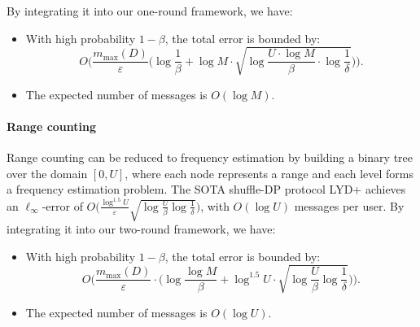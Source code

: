 By integrating it into our one-round framework, we have:

\begin{itemize}
\item With high probability $1-\beta$, the total error is bounded by: 
$$
O\Big(\frac{m_{\max}(D)}{\varepsilon}\big(\log \frac{1}{\beta}+\log M \cdot \sqrt{
\log \frac{U\cdot\log M }{\beta}
\cdot \log \frac{1}{\delta} }\big)\Big).
$$

\item The expected number of messages is $O(\log M)$.
\end{itemize}


\paragraph{Range counting}

Range counting can be reduced to frequency estimation by building a binary tree over the domain $[0,U]$, where each node represents a range and each level forms a frequency estimation problem.
The SOTA shuffle-DP protocol LYD+ \cite{luo2025rm2} achieves an $\ell_{\infty}$-error of
$O\big(\tfrac{\log^{1.5} U}{\varepsilon} \sqrt{\log \tfrac{U}{\beta} \log \tfrac{1}{\delta}}\big)$, with $O(\log U)$ messages per user.
By integrating it into our two-round framework, we have:
\begin{itemize}
\item With high probability $1-\beta$, the total error is bounded by: 
$$
O\Big(\frac{m_{\max}(D)}{\varepsilon}\cdot \big(\log\frac{\log M}{\beta}+\log^{1.5}U\cdot\sqrt{\log \frac{U}{\beta}\log\frac{1}{\delta}}\big)\Big).
$$
\item The expected number of messages is $O(\log U)$.
\end{itemize}

